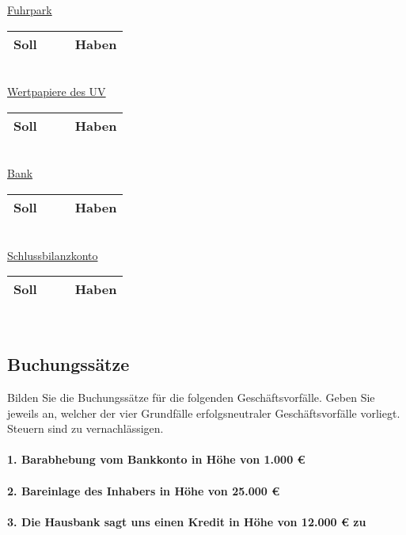 \documentclass[paper=a4, fontsize=11pt]{scrartcl}
\numberwithin{equation}{section}
\numberwithin{figure}{section}
\numberwithin{table}{section}
\begin{document}
\underline{Fuhrpark}

\begin{tabular}{cc|cc}
\hline
Soll & & & Haben \\
\hline
\end{tabular}
\\

\underline{Wertpapiere des UV}

\begin{tabular}{cc|cc}
\hline
Soll & & & Haben \\
\hline
\end{tabular}
\\

\underline{Bank}

\begin{tabular}{cc|cc}
\hline
Soll & & & Haben \\
\hline
\end{tabular}
\\

\underline{Schlussbilanzkonto}

\begin{tabular}{cc|cc}
\hline
Soll & & & Haben \\
\hline
\end{tabular}
\\

\subsection{Buchungssätze}
Bilden Sie die Buchungssätze für die folgenden Geschäftsvorfälle. Geben Sie jeweils an, welcher der vier Grundfälle erfolgsneutraler Geschäftsvorfälle vorliegt. Steuern sind zu vernachlässigen. \\

\paragraph{1. Barabhebung vom Bankkonto in Höhe von 1.000 €}

\paragraph{2. Bareinlage des Inhabers in Höhe von 25.000 €}

\paragraph{3. Die Hausbank sagt uns einen Kredit in Höhe von 12.000 € zu}
\end{document}
